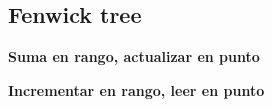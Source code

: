 \subsection{Fenwick tree}
    \textbf{Suma en rango, actualizar en punto}
    

    \textbf{Incrementar en rango, leer en punto}
    
